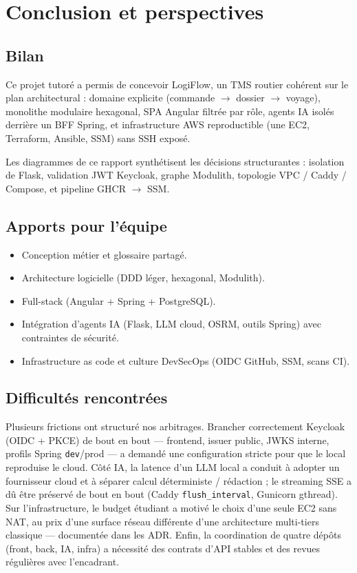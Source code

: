 \chapter{Conclusion et perspectives}
\label{chap:conclusion}

\section{Bilan}

Ce projet tutoré a permis de concevoir LogiFlow, un TMS routier cohérent sur le plan
architectural : domaine explicite (commande $\rightarrow$ dossier $\rightarrow$ voyage),
monolithe modulaire hexagonal, SPA Angular filtrée par rôle, agents IA isolés derrière un
BFF Spring, et infrastructure AWS reproductible (une EC2, Terraform, Ansible, SSM) sans SSH exposé.

Les diagrammes de ce rapport synthétisent les décisions structurantes : isolation de Flask,
validation JWT Keycloak, graphe Modulith, topologie VPC / Caddy / Compose, et pipeline
GHCR $\rightarrow$ SSM.

\section{Apports pour l'équipe}

\begin{itemize}[leftmargin=*]
  \item Conception métier et glossaire partagé.
  \item Architecture logicielle (DDD léger, hexagonal, Modulith).
  \item Full-stack (Angular + Spring + PostgreSQL).
  \item Intégration d'agents IA (Flask, LLM cloud, OSRM, outils Spring) avec contraintes de sécurité.
  \item Infrastructure as code et culture DevSecOps (OIDC GitHub, SSM, scans CI).
\end{itemize}

\section{Difficultés rencontrées}

Plusieurs frictions ont structuré nos arbitrages. Brancher correctement Keycloak
(OIDC + PKCE) de bout en bout --- frontend, issuer public, JWKS interne, profils Spring
\texttt{dev}/prod --- a demandé une configuration stricte pour que le local reproduise le
cloud. Côté IA, la latence d'un LLM local a conduit à adopter un fournisseur cloud et à
séparer calcul déterministe / rédaction ; le streaming SSE a dû être préservé de bout en
bout (Caddy \texttt{flush\_interval}, Gunicorn gthread). Sur l'infrastructure, le budget
étudiant a motivé le choix d'une seule EC2 sans NAT, au prix d'une surface réseau différente
d'une architecture multi-tiers classique --- documentée dans les ADR. Enfin, la coordination
de quatre dépôts (front, back, IA, infra) a nécessité des contrats d'API stables et des
revues régulières avec l'encadrant.

